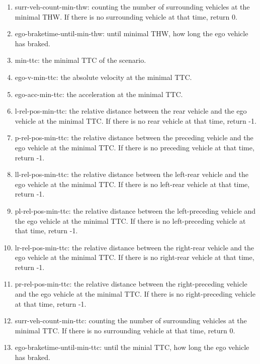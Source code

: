 \documentclass[conference]{IEEEtran}
\begin{document}
\begin{enumerate}
\item surr-veh-count-min-thw: counting the number of surrounding vehicles at the minimal THW. If there is no surrounding vehicle at that time, return 0.
\item ego-braketime-until-min-thw: until minimal THW, how long the ego vehicle has braked.
\item min-ttc: the minimal TTC of the scenario.
\item ego-v-min-ttc: the absolute velocity at the minimal TTC.
\item ego-acc-min-ttc: the acceleration at the minimal TTC.
\item l-rel-pos-min-ttc: the relative distance between the rear vehicle and the ego vehicle at the minimal TTC. If there is no rear vehicle at that time, return -1.
\item p-rel-pos-min-ttc: the relative distance between the preceding vehicle and the ego vehicle at the minimal TTC. If there is no preceding vehicle at that time, return -1.
\item ll-rel-pos-min-ttc: the relative distance between the left-rear vehicle and the ego vehicle at the minimal TTC. If there is no left-rear vehicle at that time, return -1.
\item pl-rel-pos-min-ttc: the relative distance between the left-preceding vehicle and the ego vehicle at the minimal TTC. If there is no left-preceding vehicle at that time, return -1.
\item lr-rel-pos-min-ttc: the relative distance between the right-rear vehicle and the ego vehicle at the minimal TTC. If there is no right-rear vehicle at that time, return -1.
\item pr-rel-pos-min-ttc: the relative distance between the right-preceding vehicle and the ego vehicle at the minimal TTC. If there is no right-preceding vehicle at that time, return -1.
\item surr-veh-count-min-ttc: counting the number of surrounding vehicles at the minimal TTC. If there is no surrounding vehicle at that time, return 0.
\item ego-braketime-until-min-ttc: until the minial TTC, how long the ego vehicle has braked.
\end{enumerate}

\end{document}
